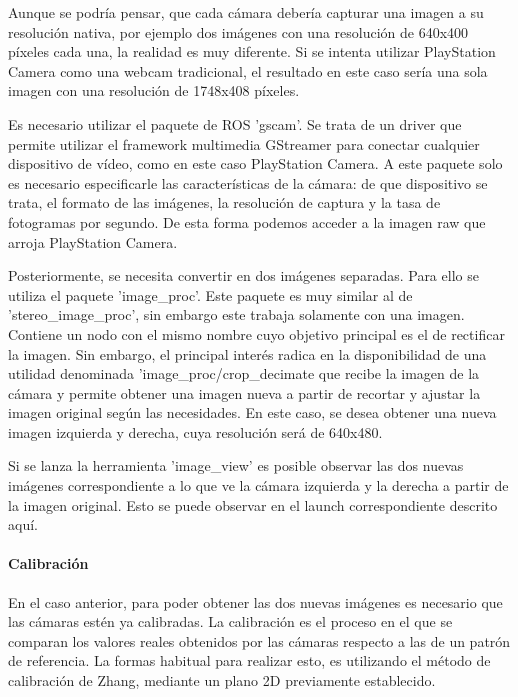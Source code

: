 Aunque se podría pensar, que cada cámara debería capturar una imagen a su
resolución nativa, por ejemplo dos imágenes con una resolución de 640x400
píxeles cada una, la realidad es muy diferente. Si se intenta utilizar
PlayStation Camera como una webcam tradicional, el resultado en este caso sería
una sola imagen con una resolución de 1748x408 píxeles.

Es necesario utilizar el paquete de ROS 'gscam'. Se trata de un driver que
permite utilizar el framework multimedia GStreamer para conectar cualquier
dispositivo de vídeo, como en este caso PlayStation Camera. A este paquete solo
es necesario especificarle las características de la cámara: de que dispositivo
se trata, el formato de las imágenes, la resolución de captura y la tasa de
fotogramas por segundo. De esta forma podemos acceder a la imagen raw que arroja
PlayStation Camera.

Posteriormente, se necesita convertir en dos imágenes separadas. Para ello se
utiliza el paquete 'image\_proc'. Este paquete es muy similar al de
'stereo\_image\_proc', sin embargo este trabaja solamente con una imagen.
Contiene un nodo con el mismo nombre cuyo objetivo principal es el de rectificar
la imagen. Sin embargo, el principal interés radica en la disponibilidad de una
utilidad denominada 'image\_proc/crop\_decimate que recibe la imagen de la
cámara y permite obtener una imagen nueva a partir de recortar y ajustar la
imagen original según las necesidades. En este caso, se desea obtener una nueva
imagen izquierda y derecha, cuya resolución será de 640x480.

Si se lanza la herramienta 'image\_view' es posible observar las dos nuevas
imágenes correspondiente a lo que ve la cámara izquierda y la derecha a partir
de la imagen original. Esto se puede observar en el launch correspondiente
descrito aquí.%

\paragraph{Calibración} \hspace{0pt}

En el caso anterior, para poder obtener las dos nuevas imágenes es necesario que
las cámaras estén ya calibradas. La calibración es el proceso en el que se
comparan los valores reales obtenidos por las cámaras respecto a las de un
patrón de referencia. La formas habitual para realizar esto, es utilizando el
método de calibración de Zhang, mediante un plano 2D previamente establecido. 

